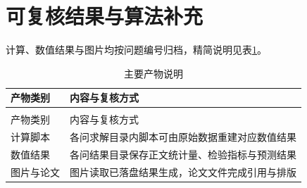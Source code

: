 \section{可复核结果与算法补充}

计算、数值结果与图片均按问题编号归档，精简说明见表\ref{tab:appendix-products}。

\begingroup
\footnotesize
\setlength{\tabcolsep}{3pt}
\begin{longtable}{>{\centering\arraybackslash}p{}>{\centering\arraybackslash}p{}}
\caption{主要产物说明}\label{tab:appendix-products}\\
\toprule
产物类别 & 内容与复核方式 \\
\midrule
\endfirsthead
\multicolumn{2}{c}{续表~\thetable}\\
\toprule
产物类别 & 内容与复核方式 \\
\midrule
\endhead
\bottomrule
\endfoot
计算脚本 & 各问求解目录内脚本可由原始数据重建对应数值结果 \\
数值结果 & 各问结果目录保存正文统计量、检验指标与预测结果 \\
图片与论文 & 图片读取已落盘结果生成，论文文件完成引用与排版 \\
\end{longtable}
\endgroup

